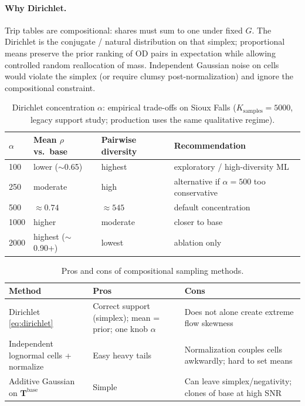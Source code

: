 \documentclass[11pt,a4paper]{report}
\newcommand{\Tbase}{\mathbf{T}^{\mathrm{base}}}
\begin{document}
\paragraph{Why Dirichlet.}
Trip tables are compositional: shares must sum to one under fixed $G$. The Dirichlet is the conjugate / natural distribution on that simplex; proportional means preserve the prior ranking of OD pairs in expectation while allowing controlled random reallocation of mass. Independent Gaussian noise on cells would violate the simplex (or require clumsy post-normalization) and ignore the compositional constraint.

\begin{table}[ht]
\centering
\caption{Dirichlet concentration $\alpha$: empirical trade-offs on Sioux Falls
($K_{\mathrm{samples}}=5000$, legacy support study; production uses the same qualitative regime).}
\label{tab:alpha}
\small
\begin{tabular}{@{}llll@{}}
\toprule
$\alpha$ & Mean $\rho$ vs.\ base & Pairwise diversity & Recommendation \\
\midrule
100  & lower ($\sim$0.65) & highest & exploratory / high-diversity ML \\
250  & moderate & high & alternative if $\alpha=500$ too conservative \\
500  & $\approx 0.74$ & $\approx 545$ & default concentration \\
1000 & higher & moderate & closer to base \\
2000 & highest ($\sim$0.90+) & lowest & ablation only \\
\bottomrule
\end{tabular}
\end{table}

\begin{table}[ht]
\centering
\caption{Pros and cons of compositional sampling methods.}
\label{tab:pros_dirichlet}
\small
\begin{tabular}{@{}p{3.2cm}p{5.1cm}p{5.1cm}@{}}
\toprule
\textbf{Method} & \textbf{Pros} & \textbf{Cons} \\
\midrule
Dirichlet \eqref{eq:dirichlet} &
Correct support (simplex); mean = prior; one knob $\alpha$ &
Does not alone create extreme flow skewness \\
Independent lognormal cells + normalize &
Easy heavy tails &
Normalization couples cells awkwardly; hard to set means \\
Additive Gaussian on $\Tbase$ &
Simple &
Can leave simplex/negativity; clones of base at high SNR \\
\bottomrule
\end{tabular}
\end{table}
\end{document}
